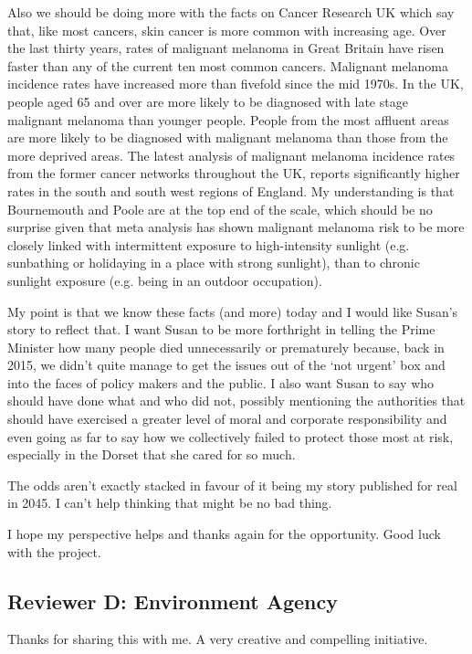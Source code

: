 Also we should be doing more with the facts on Cancer Research UK which say that, like most cancers, skin cancer is more common with increasing age. Over the last thirty years, rates of malignant melanoma in Great Britain have risen faster than any of the current ten most common cancers. Malignant melanoma incidence rates have increased more than fivefold since the mid 1970s. In the UK, people aged 65 and over are more likely to be diagnosed with late stage malignant melanoma than younger people. People from the most affluent areas are more likely to be diagnosed with malignant melanoma than those from the more deprived areas. The latest analysis of malignant melanoma incidence rates from the former cancer networks throughout the UK, reports significantly higher rates in the south and south west regions of England. My understanding is that Bournemouth and Poole are at the top end of the scale, which should be no surprise given that meta analysis has shown malignant melanoma risk to be more closely linked with intermittent exposure to high-intensity sunlight (e.g. sunbathing or holidaying in a place with strong sunlight), than to chronic sunlight exposure (e.g. being in an outdoor occupation).

My point is that we know these facts (and more) today and I would like Susan's story to reflect that. I want Susan to be more forthright in telling the Prime Minister how many people died unnecessarily or prematurely because, back in 2015, we didn't quite manage to get the issues out of the `not urgent' box and into the faces of policy makers and the public. I also want Susan to say who should have done what and who did not, possibly mentioning the authorities that should have exercised a greater level of moral and corporate responsibility and even going as far to say how we collectively failed to protect those most at risk, especially in the Dorset that she cared for so much.
 
The odds aren't exactly stacked in favour of it being my story published for real in 2045. I can't help thinking that might be no bad thing.
 
I hope my perspective helps and thanks again for the opportunity. Good luck with the project.

\subsection{Reviewer D: Environment Agency}
Thanks for sharing this with me. A very creative and compelling initiative.
 
